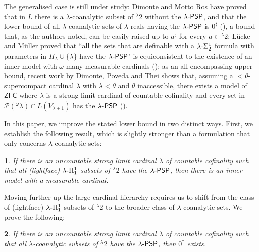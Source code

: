 \documentclass{amsart}
\numberwithin{equation}{section}
\newcommand{\thistheoremname}{}
\newtheorem*{genericthm}{\thistheoremname}
\newenvironment{namedthm}[1]
{\renewcommand{\thistheoremname}{#1}
	\begin{genericthm}}
	{\end{genericthm}}
\def\hyp{{\hbox{-}}}
\theoremstyle{definition}
\theoremstyle{remark}
\begin{document}
    The generalised case is still under study: Dimonte and Motto Ros have proved that in $L$ there is a $\lambda$-coanalytic subset of ${}^{\lambda}2$ without the $\lambda\hyp\mathsf{PSP}$, and that the lower bound of all $\lambda$-coanalytic sets of $\lambda$-reals having the $\lambda\hyp\mathsf{PSP}$ is $0^\sharp$ (\cite[Corollary 7.2.11]{DMR}), a bound that, as the authors noted, can be easily raised up to $a^\sharp$ for every $a\in{}^{\lambda}2$; L\"{u}cke and M\"{u}ller proved that ``all the sets that are definable with a $\lambda\hyp\Sigma^1_2$ formula with parameters in $H_\lambda\cup\{\lambda\}$ have the $\lambda\hyp\mathsf{PSP}$" is equiconsistent to the existence of an inner model with $\omega$-many measurable cardinals (\cite{LM}); as an all-encompassing upper bound, recent work by Dimonte, Poveda and Thei shows that, assuming a $<\theta$-supercompact cardinal $\lambda$ with $\lambda<\theta$ and $\theta$ inaccessible, there exists a model of $\mathsf{ZFC}$ where $\lambda$ is a strong limit cardinal of countable cofinality and every set in $\mathcal{P}({}^{\omega}\lambda)\cap L(V_{\lambda+1})$ has the $\lambda\hyp\mathsf{PSP}$ (\cite[Main Theorem 1]{dimonte2024baire}).   
    
       
    
    In this paper, we improve the stated lower bound in two distinct ways. First, we establish the following result, which is slightly stronger than a formulation that only concerns $\lambda$-coanalytic sets: 
    \begin{namedthm}{Corollary \ref{c310}}
	If there is an uncountable strong limit cardinal $\lambda$ of countable cofinality such that all \emph{(lightface)} $\lambda\hyp\Pi^1_1$ subsets of ${}^{\lambda}2$ have the $\lambda\hyp\mathsf{PSP}$, then there is an inner model with a measurable cardinal.
    \end{namedthm}

    Moving further up the large cardinal hierarchy requires us to shift from the class of (lightface) $\lambda\hyp\Pi^1_1$ subsets of ${}^{\lambda}2$ to the broader class of $\lambda$-coanalytic sets. We prove the following:
    
    \begin{namedthm}{Corollary \ref{theorem:main-theorem}}
	If there is an uncountable strong limit cardinal $\lambda$ of countable cofinality such that all $\lambda$-coanalytic subsets of ${}^{\lambda}2$ have the $\lambda\hyp\mathsf{PSP}$, then $0^{\dagger}$ exists.
    \end{namedthm}
\end{document}
